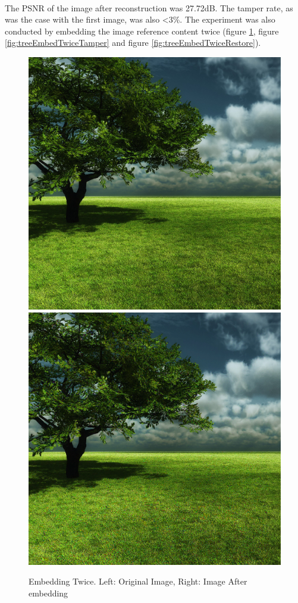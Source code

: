 \documentclass[12pt]{article}
\begin{document}
\hspace{0pt} \\
The PSNR of the image after reconstruction was 27.72dB.
The tamper rate, as was the case with the first image, was also \textless 3\%.
The experiment was also conducted by embedding the image reference content twice (figure \ref{fig:treeEmbedTwiceEmbedding}, figure \ref{fig:treeEmbedTwiceTamper} and figure \ref{fig:treeEmbedTwiceRestore}).

\begin{figure}[h]
\centerline{%
\includegraphics[scale=0.3375]{"tree"}%
\hspace{0.1cm}
\includegraphics[scale=0.45]{"Tree Embed twice 0.8 threshold/finalImage"}%
}%
\caption{Embedding Twice. Left: Original Image, Right: Image After embedding}
\label{fig:treeEmbedTwiceEmbedding}
\end{figure}
\end{document}
